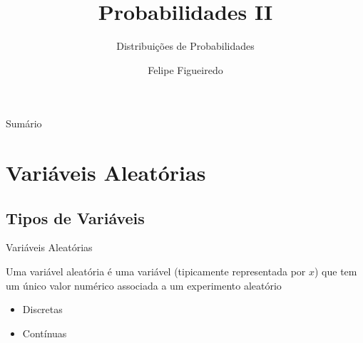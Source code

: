 \documentclass{beamer}
\title%
{Probabilidades II}
\subtitle
{Distribuições de Probabilidades} %
\author%
{Felipe Figueiredo}%
\institute[INTO] %
{Instituto Nacional de Traumatologia e Ortopedia}
\date%
{}
\begin{document}
\begin{frame}
  \titlepage
\end{frame}

\begin{frame}{Sumário}
  \tableofcontents
\end{frame}







\section{Variáveis Aleatórias}

\subsection{Tipos de Variáveis}
\begin{frame}{Variáveis Aleatórias}
\begin{definition}
  Uma \alert{variável aleatória} é uma variável (tipicamente
  representada por $x$) que tem um único valor numérico associada a um
  experimento aleatório
\end{definition}
\begin{itemize}
\item Discretas%
\item Contínuas%
\end{itemize}
\end{frame}
\end{document}
